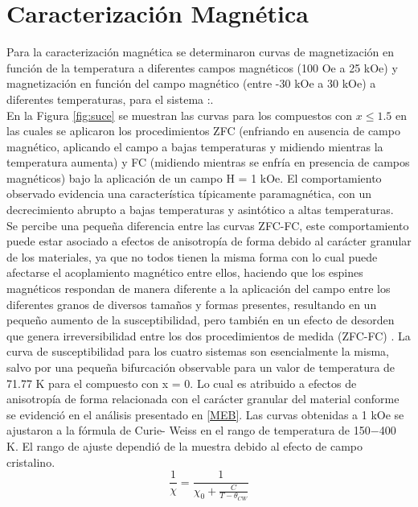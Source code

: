 \chapter{Caracterización Magnética}

Para la caracterización magnética se determinaron curvas de magnetización en
función de la temperatura a diferentes campos magnéticos (100 Oe a 25 kOe) y
magnetización en función del campo magnético (entre -30 kOe a 30 kOe) a
diferentes temperaturas, para el sistema
:.\\

En la Figura \ref{fig:suce} se muestran las curvas para los compuestos con $x\leq 1.5$
en las
cuales se aplicaron los procedimientos ZFC (enfriando en ausencia de campo
magnético, aplicando el campo a bajas temperaturas y midiendo mientras la
temperatura aumenta) y FC (midiendo mientras se enfría en presencia de campos
magnéticos) bajo la aplicación de un campo H = 1 kOe. El comportamiento
observado evidencia una característica típicamente paramagnética, con un
decrecimiento abrupto a bajas temperaturas y asintótico a altas temperaturas.\\

Se percibe una pequeña diferencia entre las curvas ZFC-FC, este
comportamiento puede estar asociado a efectos de anisotropía de forma debido al
carácter granular de los materiales, ya que no todos tienen la misma forma con
lo cual puede afectarse el acoplamiento magnético entre ellos, haciendo que los
espines magnéticos respondan de manera diferente a la aplicación del campo
entre los diferentes granos de diversos tamaños y formas presentes, resultando
en un pequeño aumento de la susceptibilidad, pero también en un efecto de
desorden que genera irreversibilidad entre los dos procedimientos de medida
(ZFC-FC) \cite{bustos2018analisis}.  La curva de susceptibilidad para los cuatro sistemas son
esencialmente la misma, salvo por una pequeña bifurcación observable para un
valor de temperatura de 71.77 K para el compuesto con x = 0. Lo cual es
atribuido a efectos de anisotropía de forma relacionada con el carácter
granular del material conforme se evidenció en el análisis presentado en
\ref{MEB}.
Las curvas obtenidas a 1 kOe se ajustaron a la fórmula de Curie- Weiss en el
rango de temperatura de 150$-$400 K. El rango de ajuste dependió de la muestra
debido al efecto de campo cristalino.\\

\begin{equation}
    \frac{1}{\chi} = \frac{1}{\chi_0+\frac{C}{T-\theta_{CW}}}
    \label{eqn:suce}
\end{equation}

